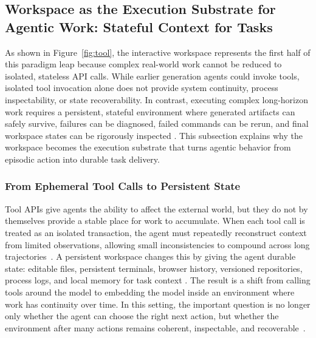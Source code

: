 \subsection{Workspace as the Execution Substrate for Agentic Work: Stateful Context for Tasks}

As shown in Figure~\ref{fig:tool}, the interactive workspace represents the first half of this paradigm leap because complex real-world work cannot be reduced to isolated, stateless API calls. While earlier generation agents could invoke tools, isolated tool invocation alone does not provide system continuity, process inspectability, or state recoverability. In contrast, executing complex long-horizon work requires a persistent, stateful environment where generated artifacts can safely survive, failures can be diagnosed, failed commands can be rerun, and final workspace states can be rigorously inspected \citep{openclaw2026repo,wang2024openhands,yang2024sweagent,suwansathit2026security,fotopoulos2026specialized,hu2025agentsentinel,ge2023llm,wu2025git}. This subsection explains why the workspace becomes the execution substrate that turns agentic behavior from episodic action into durable task delivery.

\subsubsection{From Ephemeral Tool Calls to Persistent State}

Tool APIs give agents the ability to affect the external world, but they do not by themselves provide a stable place for work to accumulate.
When each tool call is treated as an isolated transaction, the agent must repeatedly reconstruct context from limited observations, allowing small inconsistencies to compound across long trajectories~\citep{zhang2025ufo2,oliviero2llm,adam2026towards,buhler2025securing,piao2025agentbay}.
A persistent workspace changes this by giving the agent durable state: editable files, persistent terminals, browser history, versioned repositories, process logs, and local memory for task context \citep{openclaw2026repo,wang2024openhands,yan2025fault,dong2026deltabox,meng2025cellmate,laiqopenclaw,aravind2026agentwall}.
The result is a shift from calling tools around the model to embedding the model inside an environment where work has continuity over time.
In this setting, the important question is no longer only whether the agent can choose the right next action, but whether the environment after many actions remains coherent, inspectable, and recoverable~\citep{eykholt2026lessons,wang2025openhands,zhong2026don,roman2026orchestral,patel2026beyond}.

